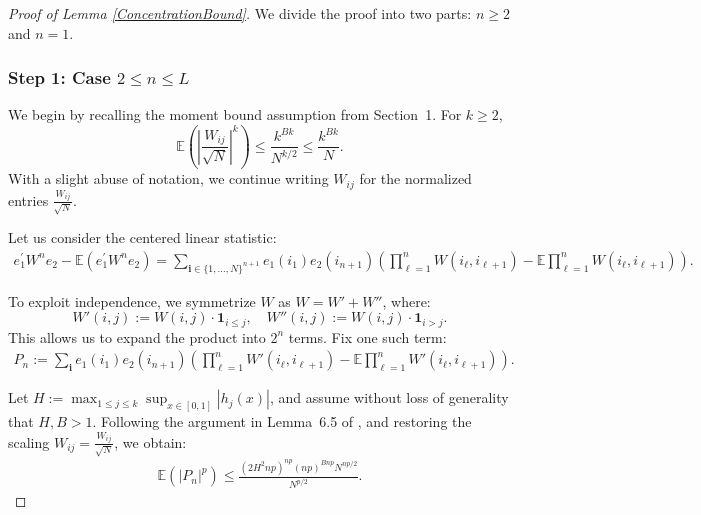 \documentclass[11pt, reqno]{amsart}
\numberwithin{equation}{section}
\begin{document}
\begin{proof}[Proof of Lemma \ref{ConcentrationBound}]
We divide the proof into two parts: \( n \ge 2 \) and \( n = 1 \).

\subsubsection*{Step 1: Case \( 2 \le n \le L \)}

We begin by recalling the moment bound assumption from Section~1. For \( k \ge 2 \),
\[
\mathbb{E}\left( \left| \frac{W_{ij}}{\sqrt{N}} \right|^k \right) \le \frac{k^{Bk}}{N^{k/2}} \le \frac{k^{Bk}}{N}.
\]
With a slight abuse of notation, we continue writing \( W_{ij} \) for the normalized entries \( \frac{W_{ij}}{\sqrt{N}} \).

Let us consider the centered linear statistic:
\begin{align}
\label{eq:centered}
e_1^\prime W^n e_2 - \mathbb{E}(e_1^\prime W^n e_2) 
= \sum_{\mathbf{i} \in \{1, \ldots, N\}^{n+1}} e_1(i_1) e_2(i_{n+1}) 
\left( \prod_{\ell = 1}^n W(i_\ell, i_{\ell+1}) - \mathbb{E} \prod_{\ell = 1}^n W(i_\ell, i_{\ell+1}) \right).
\end{align}

To exploit independence, we symmetrize \( W \) as \( W = W' + W'' \), where:
\[
W'(i,j) := W(i,j)\cdot \mathbf{1}_{i \le j}, \quad 
W''(i,j) := W(i,j)\cdot \mathbf{1}_{i > j}.
\]
This allows us to expand the product into \( 2^n \) terms. Fix one such term:
\begin{align*}
P_n := \sum_{\mathbf{i}} e_1(i_1) e_2(i_{n+1}) 
\left( \prod_{\ell=1}^n W'(i_\ell, i_{\ell+1}) - \mathbb{E} \prod_{\ell=1}^n W'(i_\ell, i_{\ell+1}) \right).
\end{align*}

Let \( H := \max_{1 \le j \le k} \sup_{x \in [0,1]} |h_j(x)| \), and assume without loss of generality that \( H, B > 1 \). Following the argument in Lemma~6.5 of \cite{erdHos2013spectral}, and restoring the scaling \( W_{ij} = \frac{W_{ij}}{\sqrt{N}} \), we obtain:
\begin{align}
\label{Expc.bound}
\mathbb{E}(|P_n|^p) \le \frac{(2H^2 n p)^{np} (np)^{Bnp} N^{np/2}}{N^{p/2}}.
\end{align}


\end{proof}
\end{document}
